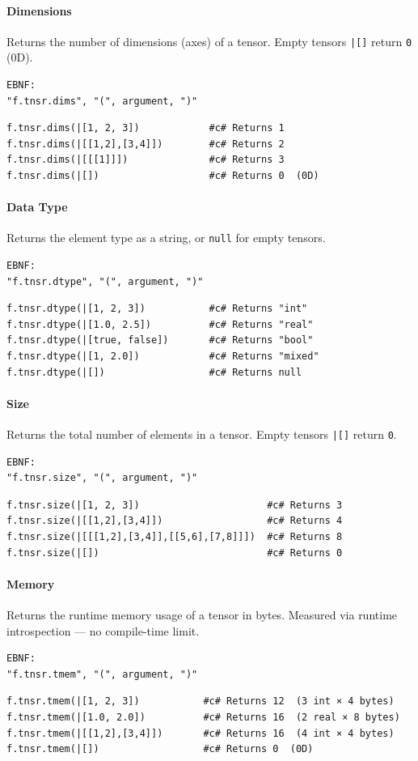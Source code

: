 \paragraph{Dimensions}
Returns the number of dimensions (axes) of a tensor. Empty tensors \texttt{|[]} return \texttt{0} (0D).
\begin{verbatim}
EBNF:
"f.tnsr.dims", "(", argument, ")"
\end{verbatim}
\begin{verbatim}
f.tnsr.dims(|[1, 2, 3])            #c# Returns 1
f.tnsr.dims(|[[1,2],[3,4]])        #c# Returns 2
f.tnsr.dims(|[[[1]]])              #c# Returns 3
f.tnsr.dims(|[])                   #c# Returns 0  (0D)
\end{verbatim}

\paragraph{Data Type}
Returns the element type as a string, or \texttt{null} for empty tensors.
\begin{verbatim}
EBNF:
"f.tnsr.dtype", "(", argument, ")"
\end{verbatim}
\begin{verbatim}
f.tnsr.dtype(|[1, 2, 3])           #c# Returns "int"
f.tnsr.dtype(|[1.0, 2.5])          #c# Returns "real"
f.tnsr.dtype(|[true, false])       #c# Returns "bool"
f.tnsr.dtype(|[1, 2.0])            #c# Returns "mixed"
f.tnsr.dtype(|[])                  #c# Returns null
\end{verbatim}

\paragraph{Size}
Returns the total number of elements in a tensor. Empty tensors \texttt{|[]} return \texttt{0}.
\begin{verbatim}
EBNF:
"f.tnsr.size", "(", argument, ")"
\end{verbatim}
\begin{verbatim}
f.tnsr.size(|[1, 2, 3])                      #c# Returns 3
f.tnsr.size(|[[1,2],[3,4]])                  #c# Returns 4
f.tnsr.size(|[[[1,2],[3,4]],[[5,6],[7,8]]])  #c# Returns 8
f.tnsr.size(|[])                             #c# Returns 0
\end{verbatim}

\paragraph{Memory}
Returns the runtime memory usage of a tensor in bytes. Measured via runtime introspection — no compile-time limit.
\begin{verbatim}
EBNF:
"f.tnsr.tmem", "(", argument, ")"
\end{verbatim}
\begin{verbatim}
f.tnsr.tmem(|[1, 2, 3])           #c# Returns 12  (3 int × 4 bytes)
f.tnsr.tmem(|[1.0, 2.0])          #c# Returns 16  (2 real × 8 bytes)
f.tnsr.tmem(|[[1,2],[3,4]])       #c# Returns 16  (4 int × 4 bytes)
f.tnsr.tmem(|[])                  #c# Returns 0  (0D)
\end{verbatim}

